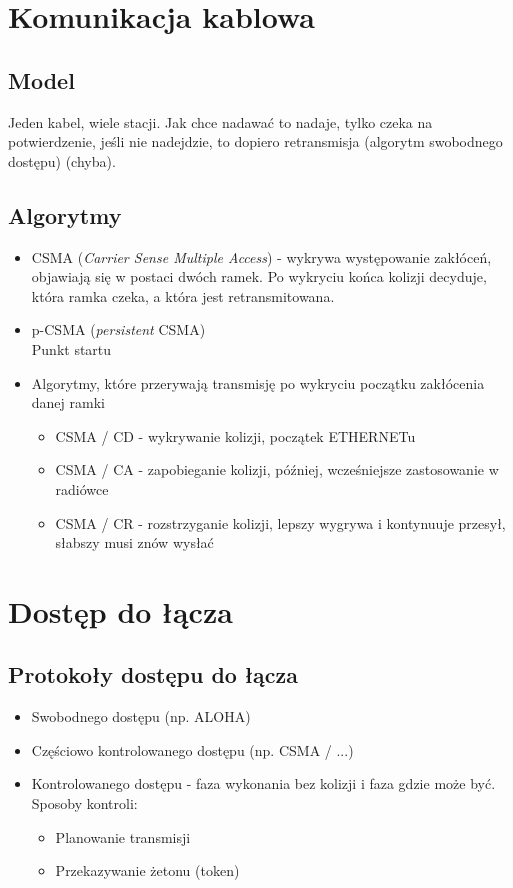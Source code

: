 \documentclass[a4paper,twoside]{article}
\begin{document}
\section{Komunikacja kablowa}
	\subsection{Model}
	Jeden kabel, wiele stacji. Jak chce nadawać to nadaje, tylko czeka na potwierdzenie, jeśli nie nadejdzie, to dopiero retransmisja (algorytm swobodnego dostępu) (chyba). 
	\subsection{Algorytmy}
	\begin{itemize}
		\item CSMA (\emph{Carrier Sense Multiple Access}) - wykrywa występowanie zakłóceń, objawiają się w postaci dwóch ramek. Po wykryciu końca kolizji decyduje, która ramka czeka, a która jest retransmitowana.
		\item p-CSMA (\emph{persistent} CSMA)\\
		Punkt startu
		\item Algorytmy, które przerywają transmisję po wykryciu początku zakłócenia danej ramki
		\begin{itemize}
			\item CSMA / CD - wykrywanie kolizji, początek ETHERNETu
			\item CSMA / CA - zapobieganie kolizji, później, wcześniejsze zastosowanie w radiówce
			\item CSMA / CR - rozstrzyganie kolizji, lepszy wygrywa i kontynuuje przesył, słabszy musi znów wysłać
		\end{itemize}
	\end{itemize}
	
\section{Dostęp do łącza}
\subsection{Protokoły dostępu do łącza}
\begin{itemize}
	\item Swobodnego dostępu (np. ALOHA)
	\item Częściowo kontrolowanego dostępu (np. CSMA / ...)
	\item Kontrolowanego dostępu - faza wykonania bez kolizji i faza gdzie może być.\\Sposoby kontroli:
	\begin{itemize}
		\item Planowanie transmisji
		\item Przekazywanie żetonu (token)
	\end{itemize}
\end{itemize}
\end{document}
